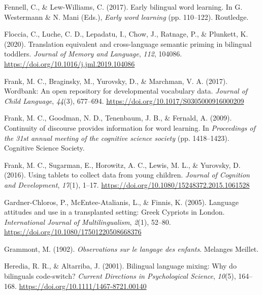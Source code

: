 \documentclass[
  man,floatsintext]{apa7}
\newlength{\cslhangindent}
\newlength{\cslentryspacingunit} %
\newenvironment{CSLReferences}[2] %
 {%
  \setlength{\parindent}{0pt}
  \ifodd #1
  \let\oldpar\par
  \def\par{\hangindent=\cslhangindent\oldpar}
  \fi
  \setlength{\parskip}{#2\cslentryspacingunit}
 }%
 {}
\begin{document}
\begin{CSLReferences}{1}{0}
\leavevmode{}%
Fennell, C., \& Lew-Williams, C. (2017). Early bilingual word learning. In G. Westermann \& N. Mani (Eds.), \emph{Early word learning} (pp. 110--122). Routledge.

\leavevmode{}%
Floccia, C., Luche, C. D., Lepadatu, I., Chow, J., Ratnage, P., \& Plunkett, K. (2020). Translation equivalent and cross-language semantic priming in bilingual toddlers. \emph{Journal of Memory and Language}, \emph{112}, 104086. \url{https://doi.org/10.1016/j.jml.2019.104086}

\leavevmode{}%
Frank, M. C., Braginsky, M., Yurovsky, D., \& Marchman, V. A. (2017). Wordbank: An open repository for developmental vocabulary data. \emph{Journal of Child Language}, \emph{44}(3), 677--694. \url{https://doi.org/10.1017/S0305000916000209}

\leavevmode{}%
Frank, M. C., Goodman, N. D., Tenenbaum, J. B., \& Fernald, A. (2009). Continuity of discourse provides information for word learning. In \emph{Proceedings of the 31st annual meeting of the cognitive science society} (pp. 1418--1423). Cognitive Science Society.

\leavevmode{}%
Frank, M. C., Sugarman, E., Horowitz, A. C., Lewis, M. L., \& Yurovsky, D. (2016). Using tablets to collect data from young children. \emph{Journal of Cognition and Development}, \emph{17}(1), 1--17. \url{https://doi.org/10.1080/15248372.2015.1061528}

\leavevmode{}%
Gardner-Chloros, P., McEntee-Atalianis, L., \& Finnis, K. (2005). Language attitudes and use in a transplanted setting: {Greek Cypriots} in {London}. \emph{International Journal of Multilingualism}, \emph{2}(1), 52--80. \url{https://doi.org/10.1080/17501220508668376}

\leavevmode{}%
Grammont, M. (1902). \emph{Observations sur le langage des enfants}. Melanges Meillet.

\leavevmode{}%
Heredia, R. R., \& Altarriba, J. (2001). Bilingual language mixing: Why do bilinguals code-switch? \emph{Current Directions in Psychological Science}, \emph{10}(5), 164--168. \url{https://doi.org/10.1111/1467-8721.00140}


\end{CSLReferences}
\end{document}
